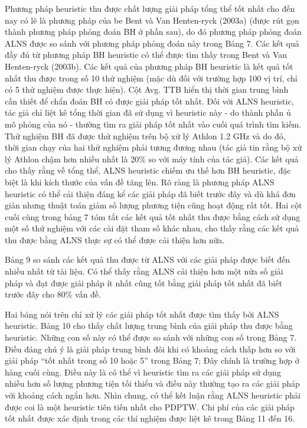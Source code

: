 Phương pháp heuristic thu được chất lượng giải pháp tổng thể tốt nhất cho đến nay có lẽ là phương pháp của be Bent và Van Henten-ryck (2003a) (được rút gọn thành phương pháp phỏng đoán BH ở phần sau), do đó phương pháp phỏng đoán ALNS được so sánh với phương pháp phỏng đoán này trong Bảng 7. Các kết quả đầy đủ từ phương pháp BH heuristic có thể được tìm thấy trong Bent và Van Henten-ryck (2003b). Các kết quả của phương pháp BH heuristic là kết quả tốt nhất thu được trong số 10 thử nghiệm (mặc dù đối với trường hợp 100 vị trí, chỉ có 5 thử nghiệm được thực hiện). Cột Avg. TTB hiển thị thời gian trung bình cần thiết để chẩn đoán BH có được giải pháp tốt nhất. Đối với ALNS heuristic, tác giả chỉ liệt kê tổng thời gian đã sử dụng vì heuristic này - do thành phần ủ mô phỏng của nó - thường tìm ra giải pháp tốt nhất vào cuối quá trình tìm kiếm. Thử nghiệm BH đã được thử nghiệm trên bộ xử lý Athlon 1.2 GHz và do đó, thời gian chạy của hai thử nghiệm phải tương đương nhau (tác giả tin rằng bộ xử lý Athlon chậm hơn nhiều nhất là 20\% so với máy tính của tác giả). Các kết quả cho thấy rằng về tổng thể, ALNS heuristic chiếm ưu thế hơn BH heuristic, đặc biệt là khi kích thước của vấn đề tăng lên. Rõ ràng là phương pháp ALNS heuristic có thể cải thiện đáng kể các giải pháp đã biết trước đây và dù khá đơn giản nhưng thuật toán giảm số lượng phương tiện cũng hoạt động rất tốt. Hai cột cuối cùng trong bảng 7 tóm tắt các kết quả tốt nhất thu được bằng cách sử dụng một số thử nghiệm với các cài đặt tham số khác nhau, cho thấy rằng các kết quả thu được bằng ALNS thực sự có thể được cải thiện hơn nữa.

Bảng 9 so sánh các kết quả thu được từ ALNS với các giải pháp được biết đến nhiều nhất từ tài liệu. Có thể thấy rằng ALNS cải thiện hơn một nửa số giải pháp và đạt được giải pháp ít nhất cũng tốt bằng giải pháp tốt nhất đã biết trước đây cho 80\% vấn đề.

Hai bảng nói trên chỉ xử lý các giải pháp tốt nhất được tìm thấy bởi ALNS heuristic. Bảng 10 cho thấy chất lượng trung bình của giải pháp thu được bằng heuristic. Những con số này có thể được so sánh với những con số trong Bảng 7. Điều đáng chú ý là giải pháp trung bình đôi khi có khoảng cách thấp hơn so với giải pháp “tốt nhất trong số 10 hoặc 5” trong Bảng 7; Đây chính là trường hợp ở hàng cuối cùng. Điều này là có thể vì heuristic tìm ra các giải pháp sử dụng nhiều hơn số lượng phương tiện tối thiểu và điều này thường tạo ra các giải pháp với khoảng cách ngắn hơn.
Nhìn chung, có thể kết luận rằng ALNS heuristic phải được coi là một heuristic tiên tiến nhất cho PDPTW. Chi phí của các giải pháp tốt nhất được xác định trong các thí nghiệm được liệt kê trong Bảng 11 đến 16.

